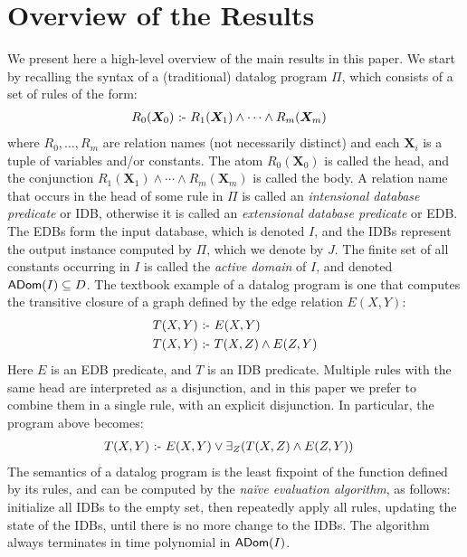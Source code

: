 \section{Overview of the Results}
\label{subsec:overview}

We present here a high-level overview of the main results in this
paper.  We start by recalling the syntax of a (traditional) datalog
program $\Pi$, which consists of a set of rules of the form:
%
\begin{align}
  R_0(\bm X_0) &\text{ :- } R_1(\bm X_1) \wedge \cdots \wedge R_m(\bm X_m) \label{eq:datalog}
\end{align}
%
where $R_0, \ldots, R_m$ are relation names (not necessarily distinct)
and each $\bm X_i$ is a tuple of variables and/or constants.  The atom
$R_0(\bm X_0)$ is called the head, and the conjunction
$R_1(\bm X_1) \wedge \cdots \wedge R_m(\bm X_m)$ is called the body.
A relation name that occurs in the head of some rule in $\Pi$ is
called an {\em intensional database predicate} or IDB, otherwise it is
called an {\em extensional database predicate} or EDB.  The EDBs form
the input database, which is denoted $I$, and the IDBs represent the
output instance computed by $\Pi$, which we denote by $J$.  The finite
set of all constants occurring in $I$ is called the {\em active
  domain} of $I$, and denoted $\textsf{ADom}(I) \subseteq D$.
%
The textbook example of a datalog program is one that computes the
transitive closure of a graph defined by the edge relation $E(X,Y)$:
%
\begin{align*}
  T(X,Y) &\text{ :- } E(X,Y) \\
  T(X,Y) &\text{ :- } T(X,Z) \wedge E(Z,Y)
\end{align*}
%
Here $E$ is an EDB predicate, and $T$ is an IDB predicate.  Multiple
rules with the same head are interpreted as a disjunction, and in this
paper we prefer to combine them in a single rule, with an explicit
disjunction.  In particular, the program above becomes:
%
\begin{align}
  T(X,Y) & \text{ :- } E(X,Y) \vee \exists_Z (T(X,Z) \wedge E(Z,Y)) \label{eq:datalog:intro}
\end{align}
%
The semantics of a datalog program is the least fixpoint of the
function defined by its rules, and can be computed by the {\em na\"ive
  evaluation algorithm}, as follows: initialize all IDBs to the empty
set, then repeatedly apply all rules, updating the state of the IDBs,
until there is no more change to the IDBs.  The algorithm always
terminates in time polynomial in $\textsf{ADom}(I)$.

